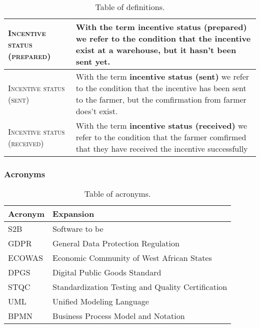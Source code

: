\begin{table}[H]
\begin{tabular}{|m{}|m{}|}
        \hline
        \textsc{Incentive status (prepared)}     &   With the term \textbf{incentive status (prepared)} we refer to the condition that the incentive exist at a warehouse, but it hasn't been sent yet. \\
        \hline
        \textsc{Incentive status (sent)}     &   With the term \textbf{incentive status (sent)} we refer to the condition that the incentive has been sent to the farmer, but the comfirmation from farmer does't exist. \\
        \hline
        \textsc{Incentive status (received)}     &   With the term \textbf{incentive status (received)} we refer to the condition that the farmer comfirmed that they have received the incentive successfully \\
        \hline
    \end{tabular}
    
    \caption{\label{tab:def_table}Table of definitions.}
    
\end{table}

\subsubsection{Acronyms}
\begin{table}[H]
    \setlength\arrayrulewidth{1pt}
    \centering
    \begin{tabular}{|l|l|}
        \rowcolor{myblue}
        \hline
        \color{white}Acronym & \color{white}Expansion \\
        \hline

        \textsc{S2B}     &   Software to be \\
        \hline
        \textsc{GDPR}  &    General Data Protection Regulation\\
        \hline
        \textsc{ECOWAS}  &    Economic Community of West African States\\
        \hline
        \textsc{DPGS}  &    Digital Public Goods Standard\\
        \hline
        \textsc{STQC}  &    Standardization Testing and Quality Certification\\
        \hline
        \textsc{UML}  &    Unified Modeling Language\\
        \hline
        \textsc{BPMN}  &    Business Process Model and Notation\\
        \hline
    \end{tabular}
    
    \caption{\label{tab:acronyms_table}Table of acronyms.}
    
\end{table}

